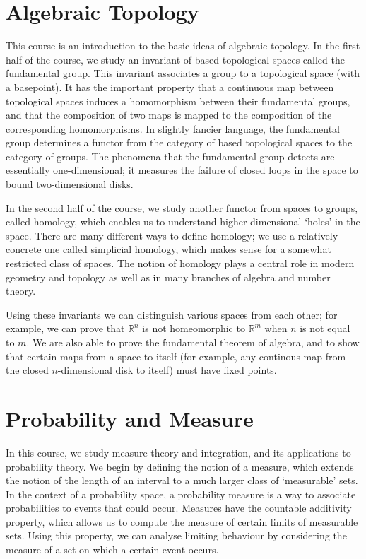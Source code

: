 \newcommand{\yearnumber}{II}


\chapter{Algebraic Topology}
This course is an introduction to the basic ideas of algebraic topology.
In the first half of the course, we study an invariant of based topological spaces called the fundamental group.
This invariant associates a group to a topological space (with a basepoint).
It has the important property that a continuous map between topological spaces induces a homomorphism between their fundamental groups, and that the composition of two maps is mapped to the composition of the corresponding homomorphisms.
In slightly fancier language, the fundamental group determines a functor from the category of based topological spaces to the category of groups.
The phenomena that the fundamental group detects are essentially one-dimensional; it measures the failure of closed loops in the space to bound two-dimensional disks.

In the second half of the course, we study another functor from spaces to groups, called homology, which enables us to understand higher-dimensional `holes' in the space.
There are many different ways to define homology; we use a relatively concrete one called simplicial homology, which makes sense for a somewhat restricted class of spaces.
The notion of homology plays a central role in modern geometry and topology as well as in many branches of algebra and number theory.

Using these invariants we can distinguish various spaces from each other; for example, we can prove that \( \mathbb R^n \) is not homeomorphic to \( \mathbb R^m \) when \( n \) is not equal to \( m \).
We are also able to prove the fundamental theorem of algebra, and to show that certain maps from a space to itself (for example, any continous map from the closed \( n \)-dimensional disk to itself) must have fixed points.



\chapter{Probability and Measure}
In this course, we study measure theory and integration, and its applications to probability theory.
We begin by defining the notion of a measure, which extends the notion of the length of an interval to a much larger class of `measurable' sets.
In the context of a probability space, a probability measure is a way to associate probabilities to events that could occur.
Measures have the countable additivity property, which allows us to compute the measure of certain limits of measurable sets.
Using this property, we can analyse limiting behaviour by considering the measure of a set on which a certain event occurs.

